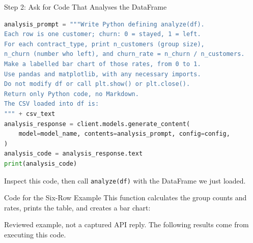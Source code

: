 \documentclass[aspectratio=169]{beamer}
\begin{document}
\begin{frame}[fragile]{Step 2: Ask for Code That Analyses the DataFrame}
\begin{lstlisting}[language=Python,commentstyle=\ttfamily\color{AMU_dk1}]
analysis_prompt = """Write Python defining analyze(df).
Each row is one customer; churn: 0 = stayed, 1 = left.
For each contract_type, print n_customers (group size),
n_churn (number who left), and churn_rate = n_churn / n_customers.
Make a labelled bar chart of those rates, from 0 to 1.
Use pandas and matplotlib, with any necessary imports.
Do not modify df or call plt.show() or plt.close().
Return only Python code, no Markdown.
The CSV loaded into df is:
""" + csv_text
analysis_response = client.models.generate_content(
    model=model_name, contents=analysis_prompt, config=config,
)
analysis_code = analysis_response.text
print(analysis_code)
\end{lstlisting}
  \small Inspect this code, then call \texttt{analyze(df)} with the DataFrame we just loaded.
\end{frame}

\begin{frame}[fragile]{Code for the Six-Row Example}
  \small This function calculates the group counts and rates, prints the table, and creates a bar chart:
  
  \footnotesize Reviewed example, not a captured API reply. The following results come from executing this code.
\end{frame}
\end{document}
